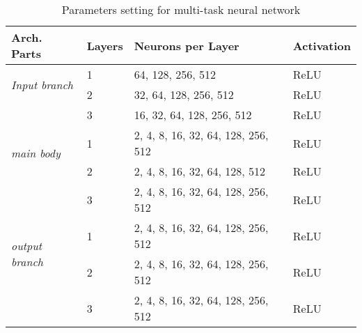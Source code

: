 \begin{table}[t]
\centering
\begin{tabular}{llll}
\toprule
\textbf{Arch. Parts} & \textbf{Layers} & \textbf{Neurons per Layer} & \textbf{Activation} \\ 
\midrule
\multirow{2}{*}{\textit{Input branch}}  & 1 & 64, 128, 256, 512 & ReLU \\ 
{} & 2 & 32, 64, 128, 256, 512 & ReLU \\
{} & 3 & 16, 32, 64, 128, 256, 512 & ReLU \\
\midrule
\multirow{2}{*}{\textit{main body}} & 1 & 2, 4, 8, 16, 32, 64, 128, 256, 512 & ReLU \\ 
{} & 2 & 2, 4, 8, 16, 32, 64, 128, 512 & ReLU \\
{} & 3 & 2, 4, 8, 16, 32, 64, 128, 256, 512 & ReLU \\
\midrule
\multirow{2}{*}{\textit{output branch}} & 1 & 2, 4, 8, 16, 32, 64, 128, 256, 512 & ReLU\\ 
{} & 2 & 2, 4, 8, 16, 32, 64, 128, 256, 512 & ReLU \\
{} & 3 & 2, 4, 8, 16, 32, 64, 128, 256, 512 & ReLU \\
\bottomrule
\end{tabular}
\caption{Parameters setting for multi-task neural network}
\label{tab:mplmtl}
\end{table}

